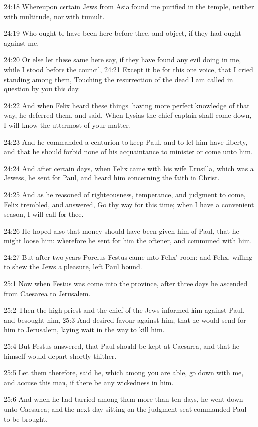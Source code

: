 24:18 Whereupon certain Jews from Asia found me purified in the
temple, neither with multitude, nor with tumult.

24:19 Who ought to have been here before thee, and object, if they had
ought against me.

24:20 Or else let these same here say, if they have found any evil
doing in me, while I stood before the council, 24:21 Except it be for
this one voice, that I cried standing among them, Touching the
resurrection of the dead I am called in question by you this day.

24:22 And when Felix heard these things, having more perfect knowledge
of that way, he deferred them, and said, When Lysias the chief captain
shall come down, I will know the uttermost of your matter.

24:23 And he commanded a centurion to keep Paul, and to let him have
liberty, and that he should forbid none of his acquaintance to
minister or come unto him.

24:24 And after certain days, when Felix came with his wife Drusilla,
which was a Jewess, he sent for Paul, and heard him concerning the
faith in Christ.

24:25 And as he reasoned of righteousness, temperance, and judgment to
come, Felix trembled, and answered, Go thy way for this time; when I
have a convenient season, I will call for thee.

24:26 He hoped also that money should have been given him of Paul,
that he might loose him: wherefore he sent for him the oftener, and
communed with him.

24:27 But after two years Porcius Festus came into Felix' room: and
Felix, willing to shew the Jews a pleasure, left Paul bound.

25:1 Now when Festus was come into the province, after three days he
ascended from Caesarea to Jerusalem.

25:2 Then the high priest and the chief of the Jews informed him
against Paul, and besought him, 25:3 And desired favour against him,
that he would send for him to Jerusalem, laying wait in the way to
kill him.

25:4 But Festus answered, that Paul should be kept at Caesarea, and
that he himself would depart shortly thither.

25:5 Let them therefore, said he, which among you are able, go down
with me, and accuse this man, if there be any wickedness in him.

25:6 And when he had tarried among them more than ten days, he went
down unto Caesarea; and the next day sitting on the judgment seat
commanded Paul to be brought.

